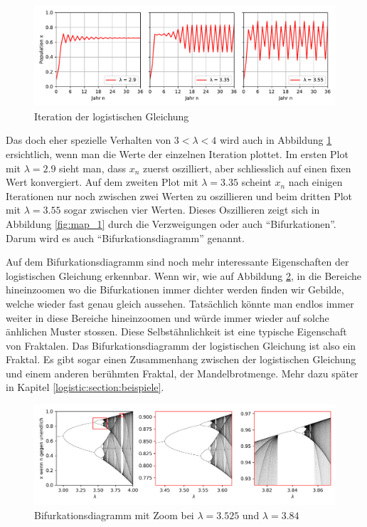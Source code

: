 \begin{figure}
    \includegraphics[width=\linewidth]{papers/logistic/figures/pop_logistic_2.pdf}
    \caption{Iteration der logistischen Gleichung}
    \label{fig:pop_logistic_2}
\end{figure}
Das doch eher spezielle Verhalten von $3 < \lambda < 4$ wird 
auch in Abbildung \ref{fig:pop_logistic_2} ersichtlich,
wenn man die Werte der einzelnen Iteration plottet.
Im ersten Plot mit $\lambda = 2.9$ sieht man, dass $x_n$ zuerst oszilliert,
aber schliesslich auf einen fixen Wert konvergiert.
Auf dem zweiten Plot mit $\lambda = 3.35$ scheint $x_n$ 
nach einigen Iterationen nur noch
zwischen zwei Werten zu oszillieren und beim
dritten Plot mit $\lambda = 3.55$ sogar zwischen vier Werten. 
Dieses Oszillieren zeigt sich in Abbildung \ref{fig:map_1}
durch die Verzweigungen oder auch ``Bifurkationen''. 
Darum wird es auch ``Bifurkationsdiagramm'' genannt. 

Auf dem Bifurkationsdiagramm sind noch mehr 
interessante Eigenschaften der logistischen Gleichung erkennbar.
Wenn wir, wie auf Abbildung \ref{fig:map_zoom}, in die Bereiche hineinzoomen
wo die Bifurkationen immer dichter werden finden wir Gebilde, 
welche wieder fast genau gleich aussehen.
Tatsächlich könnte man endlos immer weiter in diese
Bereiche hineinzoomen und würde immer wieder auf solche änhlichen Muster stossen. 
Diese Selbstähnlichkeit ist eine typische Eigenschaft von Fraktalen.
Das Bifurkationsdiagramm der logistischen Gleichung ist also ein Fraktal.
Es gibt sogar einen Zusammenhang zwischen der logistischen Gleichung und 
einem anderen berühmten Fraktal, der Mandelbrotmenge.
Mehr dazu später in Kapitel \ref{logistic:section:beispiele}.
\begin{figure}
    \includegraphics[width=\linewidth]{papers/logistic/figures/map_zoom.png}
    \caption{Bifurkationsdiagramm mit Zoom bei $\lambda = 3.525$ und $\lambda = 3.84$}
    \label{fig:map_zoom}
\end{figure}

